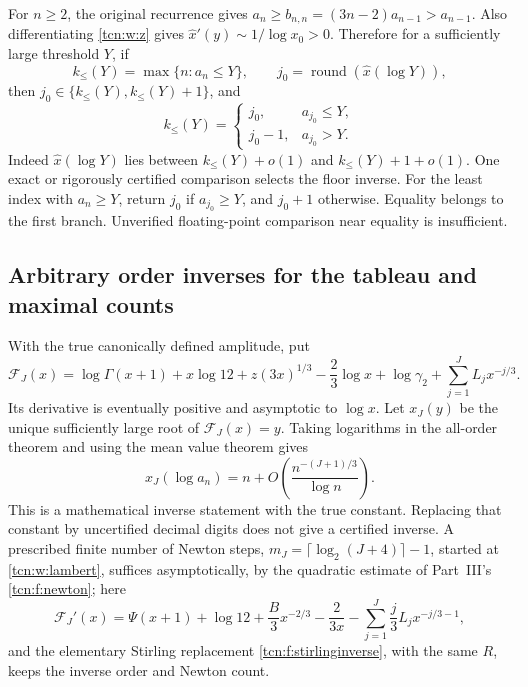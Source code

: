 \documentclass[11pt,letterpaper]{article}
\theoremstyle{remark}
\begin{document}
For $n\ge2$, the original recurrence gives
$a_n\ge b_{n,n}=(3n-2)a_{n-1}>a_{n-1}$.
Also differentiating \eqref{tcn:w:z} gives $\hat x'(y)\sim1/\log x_0>0$. Therefore for a sufficiently large threshold $Y$, if
\[
 k_\le(Y)=\max\{n:a_n\le Y\},\qquad j_0=\operatorname{round}(\hat x(\log Y)),
\]
then $j_0\in\{k_\le(Y),k_\le(Y)+1\}$, and
\begin{equation}\label{tcn:w:threshold}
 k_\le(Y)=\begin{cases}j_0,&a_{j_0}\le Y,\\j_0-1,&a_{j_0}>Y.\end{cases}
\end{equation}
Indeed $\hat x(\log Y)$ lies between $k_\le(Y)+o(1)$ and $k_\le(Y)+1+o(1)$. One exact or rigorously certified comparison selects the floor inverse. For the least index with $a_n\ge Y$, return $j_0$ if $a_{j_0}\ge Y$, and $j_0+1$ otherwise. Equality belongs to the first branch. Unverified floating-point comparison near equality is insufficient.

\subsection{Arbitrary order inverses for the tableau and maximal counts}
With the true canonically defined amplitude, put
\begin{equation}\label{tcn:w:FJ}
 \mathcal F_J(x)=\log\Gamma(x+1)+x\log12+z(3x)^{1/3}
       -\frac23\log x+\log\gamma_2+\sum_{j=1}^JL_jx^{-j/3}.
\end{equation}
Its derivative is eventually positive and asymptotic to $\log x$. Let $x_J(y)$ be the unique sufficiently large root of $\mathcal F_J(x)=y$. Taking logarithms in the all-order theorem and using the mean value theorem gives
\begin{equation}\label{tcn:w:inverseall}
 x_J(\log a_n)=n+O\!\left(\frac{n^{-(J+1)/3}}{\log n}\right).
\end{equation}
This is a mathematical inverse statement with the true constant. Replacing that constant by uncertified decimal digits does not give a certified inverse. A prescribed finite number of Newton steps, $m_J=\lceil\log_2(J+4)\rceil-1$, started at \eqref{tcn:w:lambert}, suffices asymptotically, by the quadratic estimate of Part~III's \eqref{tcn:f:newton}; here
\[
 \mathcal F_J'(x)=\Psi(x+1)+\log12+\frac B3x^{-2/3}
       -\frac2{3x}-\sum_{j=1}^J\frac j3L_jx^{-j/3-1},
\]
and the elementary Stirling replacement \eqref{tcn:f:stirlinginverse}, with the same $R$, keeps the inverse order and Newton count.
\end{document}
